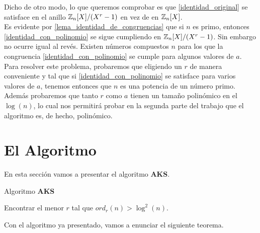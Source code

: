 Dicho de otro modo, lo que queremos comprobar es que \eqref{identidad_original} se satisface en el anillo $\mathbb{Z}_n[X]/(X^r-1)$ en vez de en $\mathbb{Z}_n[X]$.\\

Es evidente por \autoref{lema_identidad_de_congruencias} que si $n$ es primo, entonces \eqref{identidad_con_polinomio} se sigue cumpliendo en $\mathbb{Z}_n[X]/(X^r-1)$. Sin embargo no ocurre igual al revés. Existen números compuestos $n$ para los que la congruencia \eqref{identidad_con_polinomio} se cumple para algunos valores de $a$.\\

Para resolver este problema, probaremos que eligiendo un $r$ de manera conveniente y tal que si \eqref{identidad_con_polinomio} se satisface para varios valores de $a$, tenemos entonces que $n$ es una potencia de un número primo.\\

Además probaremos que tanto $r$ como $a$ tienen un tamaño polinómico en el $\log(n)$, lo cual nos permitirá probar en la segunda parte del trabajo que el algoritmo es, de hecho, polinómico.

\section{El Algoritmo}

En esta sección vamos a presentar el algoritmo \textbf{AKS}.

\begin{algorithm}[H]
	\caption{Algoritmo \textbf{AKS}}\label{aks_algorithm}
	\begin{algorithmic}[1]
				\State {}
			\EndIf
			\State
			\State Encontrar el menor $r$ tal que $ord_r(n) > \log^2(n)$.
			\State
				\State {}
			\EndIf
			\State
				\State {}
			\EndIf
			\State
					\State {}
				\EndIf
			\EndFor
			\State
			\State {}
		\EndProcedure
	\end{algorithmic}
\end{algorithm}

Con el algoritmo ya presentado, vamos a enunciar el siguiente teorema.

